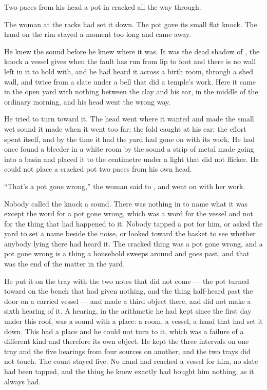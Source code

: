Two paces from his head a pot in  cracked all the way through.

The woman at the racks had set it down. The pot gave its small flat knock. The hand on the rim stayed a moment too long and came away.

He knew the sound before he knew where it was. It was the dead shadow of , the knock a vessel gives when the fault has run from lip to foot and there is no wall left in it to hold with, and he had heard it across a birth room, through a shed wall, and twice from a slate under a bell that did a temple's work. Here it came in the open yard with nothing between the clay and his ear, in the middle of the ordinary morning, and his head went the wrong way.

He tried to turn toward it. The head went where it wanted and made the small wet sound it made when it went too far; the fold caught at his ear; the effort spent itself, and by the time it had the yard had gone on with its work. He had once found a bleeder in a white room by the sound a strip of metal made going into a basin and placed it to the centimetre under a light that did not flicker. He could not place a cracked pot two paces from his own head.

“That's a pot gone wrong,” the woman said to , and went on with her work.

Nobody called the knock a sound. There was nothing in  to name what it was except the word for a pot gone wrong, which was a word for the vessel and not for the thing that had happened to it. Nobody tapped a pot for him, or asked the yard to set a name beside the noise, or looked toward the basket to see whether anybody lying there had heard it. The cracked thing was a pot gone wrong, and a pot gone wrong is a thing a household sweeps around and goes past, and that was the end of the matter in the yard.

He put it on the tray with the two notes that did not come --- the pot turned toward on the bench that had given nothing, and the thing half-heard past the door on a carried vessel --- and made a third object there, and did not make a sixth hearing of it. A hearing, in the arithmetic he had kept since the first day under this roof, was a sound with a place: a room, a vessel, a hand that had set it down. This had a place and he could not turn to it, which was a failure of a different kind and therefore its own object. He kept the three intervals on one tray and the five hearings from four sources on another, and the two trays did not touch. The count stayed five. No hand had reached a vessel for him, no slate had been tapped, and the thing he knew exactly had bought him nothing, as it always had.

